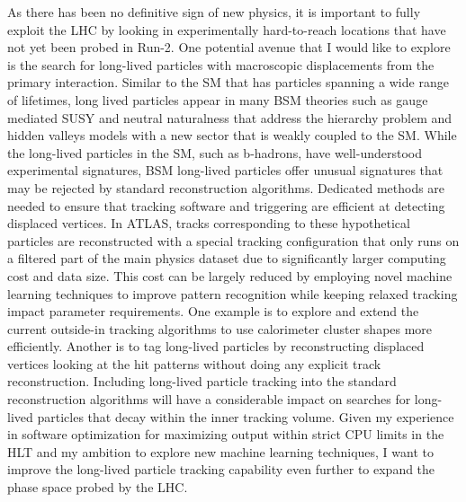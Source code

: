 \documentclass[a4paper]{article}
\begin{document}
\bigskip

As there has been no definitive sign of new physics, it is important to fully exploit the LHC by looking in experimentally hard-to-reach locations that have not yet been probed in Run-2. One potential avenue that I would like to explore is the search for long-lived particles with macroscopic displacements from the primary interaction. Similar to the SM that has particles spanning a wide range of lifetimes, long lived particles appear in many BSM theories such as gauge mediated SUSY and neutral naturalness that address the hierarchy problem and hidden valleys models with a new sector that is weakly coupled to the SM\cite{alimena2019searching}. While the long-lived particles in the SM, such as b-hadrons, have well-understood experimental signatures, BSM long-lived particles offer unusual signatures that may be rejected by standard reconstruction algorithms. Dedicated methods are needed to ensure that tracking software and triggering are efficient at detecting displaced vertices. In ATLAS, tracks corresponding to these hypothetical particles are reconstructed with a special tracking configuration that only runs on a filtered part of the main physics dataset due to significantly larger computing cost and data size. This cost can be largely reduced by employing novel machine learning techniques to improve pattern recognition while keeping relaxed tracking impact parameter requirements. One example is to explore and extend the current outside-in tracking algorithms to use calorimeter cluster shapes more efficiently. Another is to tag long-lived particles by reconstructing displaced vertices looking at the hit patterns without doing any explicit track reconstruction. Including long-lived particle tracking into the standard reconstruction algorithms will have a considerable impact on searches for long-lived particles that decay within the inner tracking volume. Given my experience in software optimization for maximizing output within strict CPU limits in the HLT and my ambition to explore new machine learning techniques, I want to improve the long-lived particle tracking capability even further to expand the phase space probed by the LHC.




\bigskip
\end{document}
